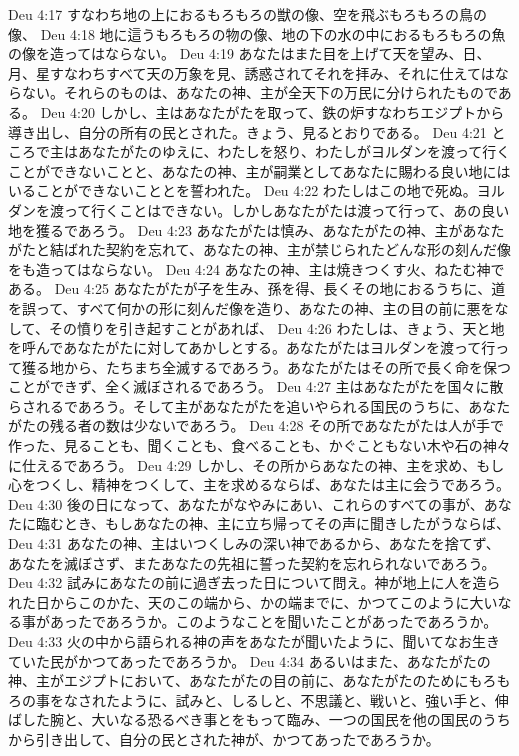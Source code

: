 Deu 4:17  すなわち地の上におるもろもろの獣の像、空を飛ぶもろもろの鳥の像、
Deu 4:18  地に這うもろもろの物の像、地の下の水の中におるもろもろの魚の像を造ってはならない。
Deu 4:19  あなたはまた目を上げて天を望み、日、月、星すなわちすべて天の万象を見、誘惑されてそれを拝み、それに仕えてはならない。それらのものは、あなたの神、主が全天下の万民に分けられたものである。
Deu 4:20  しかし、主はあなたがたを取って、鉄の炉すなわちエジプトから導き出し、自分の所有の民とされた。きょう、見るとおりである。
Deu 4:21  ところで主はあなたがたのゆえに、わたしを怒り、わたしがヨルダンを渡って行くことができないことと、あなたの神、主が嗣業としてあなたに賜わる良い地にはいることができないこととを誓われた。
Deu 4:22  わたしはこの地で死ぬ。ヨルダンを渡って行くことはできない。しかしあなたがたは渡って行って、あの良い地を獲るであろう。
Deu 4:23  あなたがたは慎み、あなたがたの神、主があなたがたと結ばれた契約を忘れて、あなたの神、主が禁じられたどんな形の刻んだ像をも造ってはならない。
Deu 4:24  あなたの神、主は焼きつくす火、ねたむ神である。
Deu 4:25  あなたがたが子を生み、孫を得、長くその地におるうちに、道を誤って、すべて何かの形に刻んだ像を造り、あなたの神、主の目の前に悪をなして、その憤りを引き起すことがあれば、
Deu 4:26  わたしは、きょう、天と地を呼んであなたがたに対してあかしとする。あなたがたはヨルダンを渡って行って獲る地から、たちまち全滅するであろう。あなたがたはその所で長く命を保つことができず、全く滅ぼされるであろう。
Deu 4:27  主はあなたがたを国々に散らされるであろう。そして主があなたがたを追いやられる国民のうちに、あなたがたの残る者の数は少ないであろう。
Deu 4:28  その所であなたがたは人が手で作った、見ることも、聞くことも、食べることも、かぐこともない木や石の神々に仕えるであろう。
Deu 4:29  しかし、その所からあなたの神、主を求め、もし心をつくし、精神をつくして、主を求めるならば、あなたは主に会うであろう。
Deu 4:30  後の日になって、あなたがなやみにあい、これらのすべての事が、あなたに臨むとき、もしあなたの神、主に立ち帰ってその声に聞きしたがうならば、
Deu 4:31  あなたの神、主はいつくしみの深い神であるから、あなたを捨てず、あなたを滅ぼさず、またあなたの先祖に誓った契約を忘れられないであろう。
Deu 4:32  試みにあなたの前に過ぎ去った日について問え。神が地上に人を造られた日からこのかた、天のこの端から、かの端までに、かつてこのように大いなる事があったであろうか。このようなことを聞いたことがあったであろうか。
Deu 4:33  火の中から語られる神の声をあなたが聞いたように、聞いてなお生きていた民がかつてあったであろうか。
Deu 4:34  あるいはまた、あなたがたの神、主がエジプトにおいて、あなたがたの目の前に、あなたがたのためにもろもろの事をなされたように、試みと、しるしと、不思議と、戦いと、強い手と、伸ばした腕と、大いなる恐るべき事とをもって臨み、一つの国民を他の国民のうちから引き出して、自分の民とされた神が、かつてあったであろうか。
